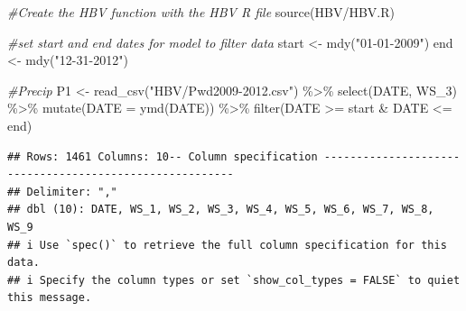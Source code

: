 \documentclass[
]{book}
\newenvironment{Shaded}{\begin{snugshade}}{\end{snugshade}}
\newcommand{\AttributeTok}[1]{\textcolor[rgb]{0.77,0.63,0.00}{#1}}
\newcommand{\CommentTok}[1]{\textcolor[rgb]{0.56,0.35,0.01}{\textit{#1}}}
\newcommand{\FunctionTok}[1]{\textcolor[rgb]{0.00,0.00,0.00}{#1}}
\newcommand{\NormalTok}[1]{#1}
\newcommand{\OtherTok}[1]{\textcolor[rgb]{0.56,0.35,0.01}{#1}}
\newcommand{\SpecialCharTok}[1]{\textcolor[rgb]{0.00,0.00,0.00}{#1}}
\newcommand{\StringTok}[1]{\textcolor[rgb]{0.31,0.60,0.02}{#1}}
\begin{document}
\begin{Shaded}
\begin{Highlighting}[]
\CommentTok{\#Create the HBV function with the HBV R file}
\FunctionTok{source}\NormalTok{(}\StringTok{\textquotesingle{}HBV/HBV.R\textquotesingle{}}\NormalTok{)}

\CommentTok{\#set start and end dates for model to filter data}
\NormalTok{start }\OtherTok{\textless{}{-}} \FunctionTok{mdy}\NormalTok{(}\StringTok{"01{-}01{-}2009"}\NormalTok{)}
\NormalTok{end }\OtherTok{\textless{}{-}} \FunctionTok{mdy}\NormalTok{(}\StringTok{"12{-}31{-}2012"}\NormalTok{)}

\CommentTok{\#Precip}
\NormalTok{P1 }\OtherTok{\textless{}{-}} \FunctionTok{read\_csv}\NormalTok{(}\StringTok{"HBV/Pwd2009{-}2012.csv"}\NormalTok{) }\SpecialCharTok{\%\textgreater{}\%} 
         \FunctionTok{select}\NormalTok{(DATE, WS\_3) }\SpecialCharTok{\%\textgreater{}\%}
         \FunctionTok{mutate}\NormalTok{(}\AttributeTok{DATE =} \FunctionTok{ymd}\NormalTok{(DATE)) }\SpecialCharTok{\%\textgreater{}\%}
         \FunctionTok{filter}\NormalTok{(DATE }\SpecialCharTok{\textgreater{}=}\NormalTok{ start }\SpecialCharTok{\&}\NormalTok{ DATE }\SpecialCharTok{\textless{}=}\NormalTok{ end)}
\end{Highlighting}
\end{Shaded}

\begin{verbatim}
## Rows: 1461 Columns: 10-- Column specification --------------------------------------------------------
## Delimiter: ","
## dbl (10): DATE, WS_1, WS_2, WS_3, WS_4, WS_5, WS_6, WS_7, WS_8, WS_9
## i Use `spec()` to retrieve the full column specification for this data.
## i Specify the column types or set `show_col_types = FALSE` to quiet this message.
\end{verbatim}

\begin{Shaded}
\end{Shaded}
\end{document}
